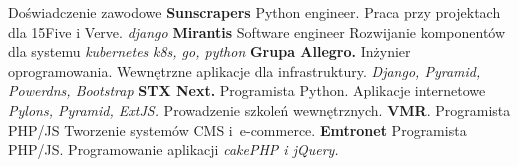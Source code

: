 \begin{rubric}{Doświadczenie zawodowe}
\entry*[II 2017 -- currently]\textbf{Sunscrapers}\newline
    Python engineer. Praca przy projektach dla 15Five i Verve.\newline
    \textit{django}
\entry*[II 2016 -- I 2017]\textbf{Mirantis}\newline
    Software engineer\newline
    Rozwijanie komponentów dla systemu \textit{kubernetes}
    \textit{k8s, go, python}
\entry*[X 2013 -- II 2016]\textbf{Grupa Allegro.}\newline
    Inżynier oprogramowania.\newline
    Wewnętrzne aplikacje dla infrastruktury.\newline
    \textit{Django, Pyramid, Powerdns, Bootstrap}
\entry*[V 2011 -- IX 2013]\textbf{STX Next.}\newline
    Programista Python.\newline
    Aplikacje internetowe \newline
    \textit{Pylons, Pyramid, ExtJS.}\newline
    Prowadzenie szkoleń wewnętrznych.
\entry*[XII 2009 -- IV 2011]\textbf{VMR}.
    Programista PHP/JS\newline
    Tworzenie systemów CMS i~\hbox{e-commerce}.
\entry*[VI 2009 -- XII 2009]\textbf{Emtronet} Programista PHP/JS.\newline
    Programowanie aplikacji\newline
    \textit{cakePHP i jQuery.}
\end{rubric}

